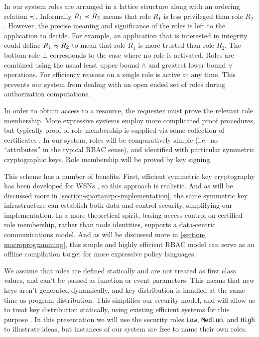 In our system roles are arranged in a lattice structure along with an ordering relation $\preccurlyeq$.
Informally $R_1 \preccurlyeq R_2$ means that role $R_1$ is less privileged than role $R_2$. However, the
precise meaning and significance of the roles is left to the application to decide. For example,
an application that is interested in integrity could define $R_1 \preccurlyeq R_2$ to mean that role
$R_1$ is more trusted than role $R_2$. The bottom role $\bot$ corresponds to the case where no
role is activated. Roles are combined using the usual least upper bound $\wedge$ and greatest
lower bound $\vee$ operations. For efficiency reasons on a single role is active at any time.
This prevents our system from dealing with an open ended set of roles during authorization
computations.

In order to obtain access to a resource, the requester must prove the relevant role membership.
More expressive systems employ more complicated proof procedures, but typically proof of role
membership is supplied via some collection of certificates \cite{Clarke:CCDSS,Li:DCDTM}. In our
system, roles will be comparatively simple (i.e.~no ``attributes'' in the typical RBAC sense),
and identified with particular symmetric cryptographic keys. Role membership will be proved by
key signing.

This scheme has a number of benefits. First, efficient symmetric key cryptography has been
developed for WSNs \cite{rogaway-ocb-2003,1031515}, so this approach is realistic. And as will
be discussed more in \autoref{section-spartanrpc-implementation}, the same symmetric key
infrastructure can establish both data and control security, simplifying our implementation. In
a more theoretical spirit, basing access control on certified role membership, rather than node
identities, supports a data-centric communications model. And as will be discussed more in
\autoref{section-macroprogramming}, this simple and highly efficient RBAC model can serve as an
offline compilation target for more expressive policy languages.

We assume that roles are defined statically and are not treated as first class values, and can't
be passed as function or event parameters. This means that new keys aren't generated
dynamically, and key distribution is handled at the same time as program distribution. This
simplifies our security model, and will allow us to treat key distribution statically, using
existing efficient systems for this purpose
\cite{Eschenauer-keymanagement-2002,Huang-keymanagement-2004,du-keydistribution-2005,liu-keydistribution-2005,camtepe-bulent-05}.
In this presentation we will use the security roles \texttt{Low}, \texttt{Medium}, and
\texttt{High} to illustrate ideas, but instances of our system are free to name their own roles.

